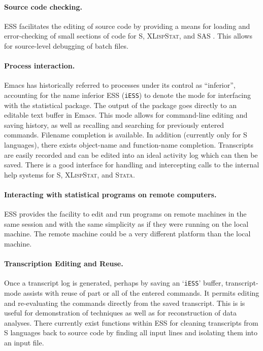 \documentclass{article}
\newcommand*{\SAS}{\textsc{SAS}{\textregistered} }
\newcommand*{\XLispStat}{\textsc{XLispStat}}
\newcommand*{\Stata}{\textsc{Stata}}
\newcommand{\stexttt}[1]{{\small\texttt{#1}}}
\newcommand{\file}[1]{`\stexttt{#1}'}
\begin{document}
\paragraph{Source code checking.}
ESS facilitates the editing of source code by providing a means for
loading and error-checking of small sections of code for S,
\XLispStat, and \SAS.  This allows for source-level debugging of batch
files.

\paragraph{Process interaction.}
Emacs has historically referred to processes under its control as
``inferior'', accounting for the name inferior ESS (\stexttt{iESS}) to
denote the mode for interfacing with the statistical package.  The
output of the package goes directly to an editable text buffer in Emacs.
This mode allows for command-line editing and saving history, as well as
recalling and searching for previously entered commands.  Filename
completion is available.  In addition (currently only for S languages),
there exists object-name and function-name completion.  Transcripts are
easily recorded and can be edited into an ideal activity log which can
then be saved.  There is a good interface for handling and intercepting
calls to the internal help systems for S, \XLispStat, and \Stata.

\paragraph{Interacting with statistical programs on remote computers.}
ESS provides the facility to edit and run programs on remote machines
in the same session and with the same simplicity as if they were
running on the local machine.  The remote machine could be a very
different platform than the local machine.

\paragraph{Transcription Editing and Reuse.}
Once a transcript log is generated, perhaps by saving an \file{iESS}
buffer, transcript-mode assists with reuse of part or all of the
entered commands.  It permits editing and re-evaluating the commands
directly from the saved transcript.  This is is useful for
demonstration of techniques as well as for reconstruction of data
analyses.  There currently exist functions within ESS for cleaning
transcripts from S languages back to source code by finding all input
lines and isolating them into an input file.
\end{document}
